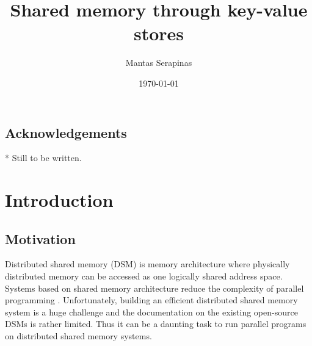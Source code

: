 \documentclass[bsc,frontabs,twoside,singlespacing,parskip,deptreport]{infthesis}     %
\begin{document}
\title{Shared memory through key-value stores}

\author{Mantas Serapinas}



\date{\today}



\maketitle


\section*{Acknowledgements}
* Still to be written.

\tableofcontents



\chapter{Introduction}

\section{Motivation}

Distributed shared memory (DSM) is memory architecture where physically distributed memory can be accessed as one logically shared address space. Systems based on shared memory architecture reduce the complexity of parallel programming \citep{vodca}. Unfortunately, building an efficient distributed shared memory system is a huge challenge and the documentation on the existing open-source DSMs is rather limited. Thus it can be a daunting task to run parallel programs on distributed shared memory systems.
\end{document}
